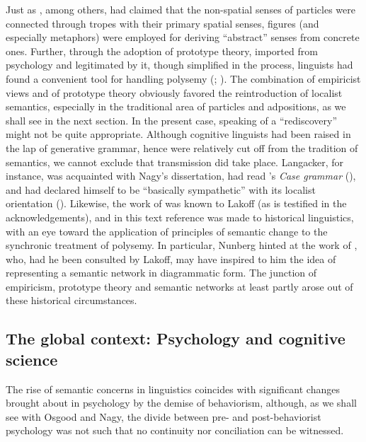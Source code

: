 \documentclass[english,output=paper,colorlinks,citecolor=brown]{../langscibook}
\begin{document}
Just as \citet{Leibniz1923Analysis}, among others, had claimed that the non-spatial senses of particles were connected through tropes with their primary spatial senses, figures (and especially metaphors) were employed for deriving “abstract” senses from concrete ones. Further, through the adoption of prototype theory, imported from psychology and legitimated by it, though simplified in the process, linguists had found a convenient tool for handling polysemy (\citealt{Kleiber1990}; \citealt{Fortis2018Prototype}). The combination of empiricist views and of prototype theory obviously favored the reintroduction of localist semantics, especially in the traditional area of particles and adpositions, as we shall see in the next section. In the present case, speaking of a “rediscovery” might not be quite appropriate. Although cognitive linguists had been raised in the lap of generative grammar, hence were relatively cut off from the tradition of semantics, we cannot exclude that transmission did take place. Langacker, for instance, was acquainted with Nagy’s dissertation, had read \citeauthor{Anderson1971}’s \textit{Case grammar} (\citeyear{Anderson1971}), and had declared himself to be “basically sympathetic” with its localist orientation (\citeyear{Anderson1973}). Likewise, the work of \citet{Nunberg1978} was known to Lakoff (as is testified in the acknowledgements), and in this text reference was made to historical linguistics, with an eye toward the application of principles of semantic change to the synchronic treatment of polysemy. In particular, Nunberg hinted at the work of \citet{Darmesteter1887}, who, had he been consulted by Lakoff, may have inspired to him the idea of representing a semantic network in diagrammatic form. The junction of empiricism, prototype theory and semantic networks at least partly arose out of these historical circumstances.

\subsection{The global context: Psychology and cognitive science}

The rise of semantic concerns in linguistics coincides with significant changes brought about in psychology by the demise of behaviorism, although, as we shall see with Osgood and Nagy, the divide between pre- and post-behaviorist psychology was not such that no continuity nor conciliation can be witnessed.
\end{document}
